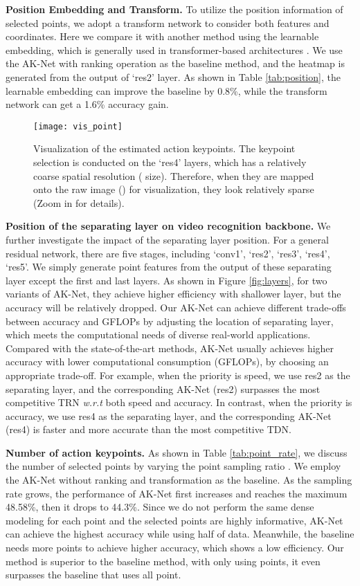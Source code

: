 \documentclass[journal]{IEEEtran}
\begin{document}
\textbf{Position Embedding and Transform.}
To utilize the position information of selected points, we adopt a transform network to consider both features and coordinates.
Here we compare it with another method using the learnable embedding, which is generally used in transformer-based architectures \cite{bertasius2021space, liu2021video}.
We use the AK-Net with ranking operation as the baseline method, and the heatmap is generated from the output of `res2' layer.
As shown in Table \ref{tab:position}, the learnable embedding can improve the baseline by 0.8\%, while the transform network can get a 1.6\% accuracy gain.


\begin{figure*}
    \centering
    \texttt{[image: vis\_point]}
    \caption{
    Visualization of the estimated action keypoints.
    The keypoint selection is conducted on the `res4' layers, which has a relatively coarse spatial resolution ( size). Therefore, when they are  mapped onto the raw image () for visualization, they look relatively sparse
(Zoom in for details).
    }
    \label{fig:vis_point}
\end{figure*}

\textbf{Position of the separating layer on video recognition backbone.}
We further investigate the impact of the separating layer position.
For a general residual network, there are five stages, including `conv1', `res2', `res3', `res4', `res5'.
We simply generate point features from the output of these separating layer  except the first and last layers.
As shown in Figure \ref{fig:layers}, for two variants of AK-Net, they achieve higher efficiency with shallower layer, but the accuracy will be relatively dropped.
Our AK-Net can achieve different trade-offs between accuracy and GFLOPs by adjusting the location of separating layer, which meets the computational needs of diverse real-world applications.
Compared with the state-of-the-art methods, AK-Net usually achieves higher accuracy with lower computational consumption (GFLOPs), by choosing an appropriate trade-off. 
For example, when the priority is speed, we use res2 as the separating layer, and the corresponding AK-Net (res2) surpasses the most competitive TRN \emph{w.r.t} both speed and accuracy. 
In contrast, when the priority is accuracy, we use res4 as the separating layer, and the corresponding AK-Net (res4) is faster and more accurate than the most competitive TDN. 

\textbf{Number of action keypoints.}
As shown in Table \ref{tab:point_rate}, we discuss the number of selected points by varying the point sampling ratio .
We employ the AK-Net without ranking and transformation as the baseline.
As the sampling rate grows, the performance of AK-Net first increases and reaches the maximum 48.58\%, then it drops to 44.3\%.
Since we do not perform the same dense modeling for each point and the selected points are highly informative, AK-Net can achieve the highest accuracy while using half of data.
Meanwhile, the baseline needs more points to achieve higher accuracy, which shows a low efficiency.
Our method is superior to the baseline method, with only using  points, it even surpasses the baseline that uses all point.
\end{document}
